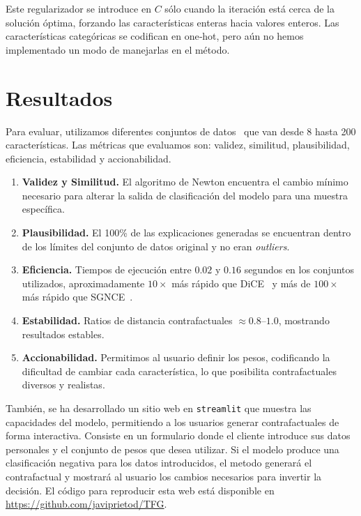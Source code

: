 \documentclass[12pt]{extarticle}
\numberwithin{equation}{section}
\begin{document}
Este regularizador se introduce en $C$ sólo cuando la iteración está cerca de la solución óptima, forzando las características enteras hacia valores enteros. Las características categóricas se codifican en one‑hot, pero aún no hemos implementado un modo de manejarlas en el método.

\section*{Resultados}
Para evaluar, utilizamos diferentes conjuntos de datos~\cite{kaggleLoan1_res,spambase_res,santander_res} que van desde 8 hasta 200 características. Las métricas que evaluamos son: validez, similitud, plausibilidad, eficiencia, estabilidad y accionabilidad.
\begin{enumerate}
\item \textbf{Validez y Similitud.} El algoritmo de Newton encuentra el cambio mínimo necesario para alterar la salida de clasificación del modelo para una muestra específica.
\item \textbf{Plausibilidad.} El 100\% de las explicaciones generadas se encuentran dentro de los límites del conjunto de datos original y no eran \emph{outliers}.
\item \textbf{Eficiencia.} Tiempos de ejecución entre $0.02$ y $0.16$ segundos en los conjuntos utilizados, aproximadamente $10\times$ más rápido que DiCE~\cite{dice_res} y más de $100\times$ más rápido que SGNCE~\cite{sgnce_res}.
\item \textbf{Estabilidad.} Ratios de distancia contrafactuales $\approx0.8$–$1.0$, mostrando resultados estables.
\item \textbf{Accionabilidad.} Permitimos al usuario definir los pesos, codificando la dificultad de cambiar cada característica, lo que posibilita contrafactuales diversos y realistas.
\end{enumerate}

También, se ha desarrollado un sitio web en \texttt{streamlit} que muestra las capacidades del modelo, permitiendo a los usuarios generar contrafactuales de forma interactiva. Consiste en un formulario donde el cliente introduce sus datos personales y el conjunto de pesos que desea utilizar. Si el modelo produce una clasificación negativa para los datos introducidos, el metodo generará el contrafactual y mostrará al usuario los cambios necesarios para invertir la decisión. El código para reproducir esta web está disponible en \url{https://github.com/javiprietod/TFG}.
\end{document}
